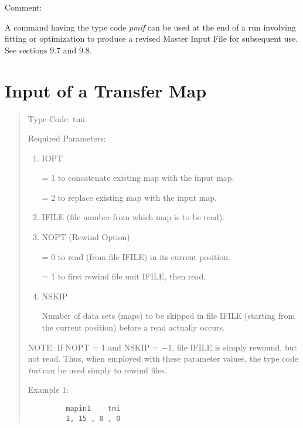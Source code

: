 \vspace{5mm}
     Comment:
\vspace{2mm}

           A command having the type code {\em pmif} can be used at the end
of a \Mary run involving fitting or optimization to produce a revised
Master Input File for subsequent use.  See sections 9.7 and 9.8.

\newpage
\section{Input of a Transfer Map}
\begin{quotation}
\noindent     Type Code:  tmi  
\vspace{5mm}

\noindent Required Parameters:
\begin{enumerate}
      \item  IOPT

             = 1 to concatenate existing map with the input map.

             = 2 to replace existing map with the input map.

      \item  IFILE (file number from which map is to be read).

      \item  NOPT (Rewind Option)

             = 0 to read (from file IFILE) in its current position.

             = 1 to first rewind file unit IFILE, then read.

      \item  NSKIP

             Number of data sets (maps) to be skipped in file IFILE
             (starting from the current position) before a read actually
             occurs.
\end{enumerate}

\vspace{5mm}
     NOTE:  If NOPT = 1 and NSKIP = $-1$, file IFILE is simply rewound, but
not read.  Thus, when employed with these parameter values, the type code
{\em tmi } can be used simply to rewind files.

\vspace{5mm}
\noindent     Example 1:
\begin{verbatim}
         mapin1    tmi
         1, 15 , 0 , 0
\end{verbatim}
\end{quotation}
